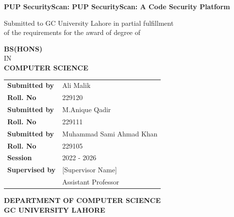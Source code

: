 \documentclass[12pt,a4paper]{report}
\begin{document}
\begin{titlepage}
    \centering
    \vspace*{1cm}

    {\Large\bfseries PUP SecurityScan:  PUP SecurityScan: A Code Security Platform\\}
    \vspace{1cm}

    {\large Submitted to GC University Lahore in partial fulfillment\\
    of the requirements for the award of degree of\\}
    \vspace{1.5cm}

    {\Large\bfseries BS(HONS)\\}
    \vspace{0.3cm}
    {\Large IN\\}
    \vspace{0.3cm}
    {\Large\bfseries COMPUTER SCIENCE\\}

    \vspace{1.5cm}

    \begin{tabular}{ll}
        \textbf{Submitted by} & Ali Malik \\
        \textbf{Roll. No} & 229120 \\[0.3cm]
        \textbf{Submitted by} & M.Anique Qadir \\
        \textbf{Roll. No} & 229111 \\[0.3cm]
        \textbf{Submitted by} & Muhammad Sami Ahmad Khan\\
        \textbf{Roll. No} & 229105 \\[0.4cm]

        \textbf{Session} & 2022 - 2026 \\[0.4cm]
        \textbf{Supervised by} & {[}Supervisor Name{]} \\
        & Assistant Professor \\
    \end{tabular}

    \vfill

    {\Large\bfseries DEPARTMENT OF COMPUTER SCIENCE\\}
    \vspace{0.3cm}
    {\Large\bfseries GC UNIVERSITY LAHORE\\}
\end{titlepage}
\end{document}
